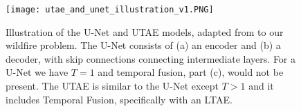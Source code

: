\begin{figure}
    \centering
    \texttt{[image: utae\_and\_unet\_illustration\_v1.PNG]}
    \caption{Illustration of the U-Net and UTAE models, adapted from \cite{garnot2021panoptic} to our wildfire problem. The U-Net consists of (a) an encoder and (b) a decoder, with skip connections connecting intermediate layers. For a U-Net we have $T=1$ and temporal fusion, part (c), would not be present.  The UTAE is similar to the U-Net except $T>1$ and it includes Temporal Fusion, specifically with an LTAE.}
    \label{fig:utae_and_unet_illustration}
\end{figure}
